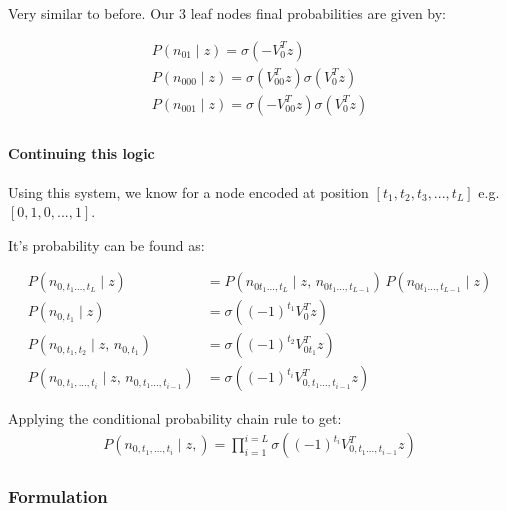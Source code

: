 \documentclass[parskip]{komatufte}
\begin{document}
Very similar to before.
Our 3 leaf nodes final probabilities are given by:

\begin{align}
P(n_{01}\mid z)=\sigma(-V_{0}^{T}z) \\
P(n_{000}\mid z)=\sigma(V_{00}^{T}z)\sigma(V_{0}^{T}z) \\
P(n_{001}\mid z)=\sigma(-V_{00}^{T}z)\sigma(V_{0}^{T}z) \\
\end{align}

\paragraph{Continuing this logic}

Using this system,
we know for a node encoded at position $[t_{1},t_{2},t_{3},...,t_{L}]$
e.g. $[0,1,0,...,1]$.

It's probability can be found as: 

\begin{align}
P(n_{0,t_{1}...,t_{L}}\mid z) &= P(n_{0t_{1}...,t_{L}}\mid z,\,n_{0t_{1}...,t_{L-1}})\,P(n_{0t_{1}...,t_{L-1}}\mid z)\\
%
P(n_{0,t_{1}}\mid z)&=\sigma\left((-1)^{t_{1}}V_{0}^{T}z\right)\\
%
P(n_{0,t_{1},t_{2}}\mid z,\,n_{0,t_{1}})&=\sigma\left((-1)^{t_{2}}V_{0t_{1}}^{T}z\right)\\
%
P(n_{0,t_{1},...,t_{i}}\mid z,\,n_{0,t_{1}...,t_{i-1}})&=\sigma\left((-1)^{t_{i}}V_{0,t_{1}...,t_{i-1}}^{T}z\right)
\end{align}

Applying the conditional probability chain rule to get:
\begin{align}
P(n_{0,t_{1},...,t_{i}}\mid z,)=\prod_{i=1}^{i=L}\sigma\left((-1)^{t_{i}}V_{0,t_{1}...,t_{i-1}}^{T}z\right)
\end{align}

\subsubsection{Formulation}
\end{document}
